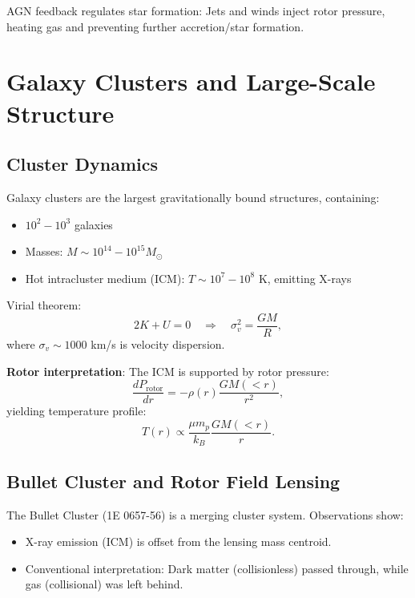 \documentclass[12pt,a4paper]{article}
\theoremstyle{definition}
\theoremstyle{remark}
\begin{document}
AGN feedback regulates star formation: Jets and winds inject rotor pressure, heating gas and preventing further accretion/star formation.

\section{Galaxy Clusters and Large-Scale Structure}

\subsection{Cluster Dynamics}

Galaxy clusters are the largest gravitationally bound structures, containing:
\begin{itemize}
\item $10^{2}-10^3$ galaxies
\item Masses: $M \sim 10^{14}-10^{15} M_\odot$
\item Hot intracluster medium (ICM): $T \sim 10^7-10^8$ K, emitting X-rays
\end{itemize}

Virial theorem:
\begin{equation}
2K + U = 0 \quad \Rightarrow \quad \sigma_v^2 = \frac{GM}{R},
\end{equation}
where $\sigma_v \sim 1000$ km/s is velocity dispersion.

\textbf{Rotor interpretation}: The ICM is supported by rotor pressure:
\begin{equation}
\frac{dP_{\text{rotor}}}{dr} = -\rho(r) \frac{GM(<r)}{r^2},
\end{equation}
yielding temperature profile:
\begin{equation}
T(r) \propto \frac{\mu m_p}{k_B} \frac{GM(<r)}{r}.
\end{equation}

\subsection{Bullet Cluster and Rotor Field Lensing}

The Bullet Cluster (1E 0657-56) is a merging cluster system. Observations show:
\begin{itemize}
\item X-ray emission (ICM) is offset from the lensing mass centroid.
\item Conventional interpretation: Dark matter (collisionless) passed through, while gas (collisional) was left behind.
\end{itemize}
\end{document}
